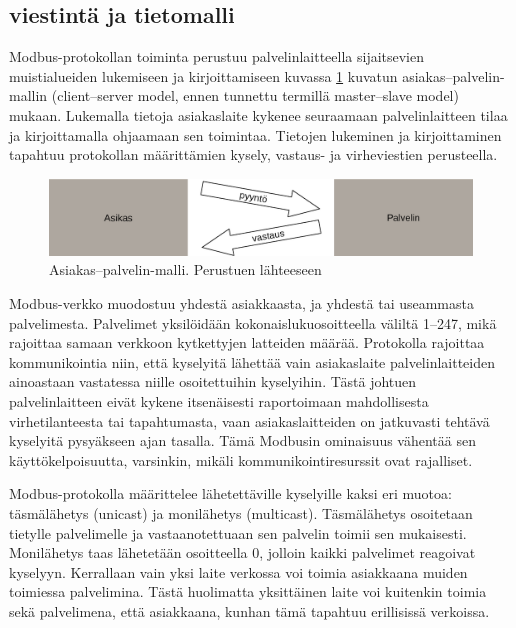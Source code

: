   \subsection{viestintä ja tietomalli}

  Modbus-protokollan toiminta perustuu palvelinlaitteella sijaitsevien muistialueiden lukemiseen ja kirjoittamiseen kuvassa \ref{fig:c_s} kuvatun asiakas--palvelin-mallin (client--server model, ennen tunnettu termillä master--slave model) mukaan.  Lukemalla tietoja asiakaslaite kykenee seuraamaan palvelinlaitteen tilaa ja kirjoittamalla ohjaamaan sen toimintaa. Tietojen lukeminen ja kirjoittaminen tapahtuu protokollan määrittämien kysely, vastaus- ja virheviestien perusteella.\parencite{modbusAppSpec}

  \begin{figure}[h]
    \centering
    \includegraphics[width=1\textwidth]{figures/client_server}
    \caption[asiakas--palvelin-malli]{Asiakas--palvelin-malli.  Perustuen lähteeseen \parencite{modbusAppSpec}}
    \label{fig:c_s}
  \end{figure}

  Modbus-verkko muodostuu yhdestä asiakkaasta, ja yhdestä tai useammasta palvelimesta. Palvelimet yksilöidään kokonaislukuosoitteella väliltä 1--247, mikä rajoittaa samaan verkkoon kytkettyjen latteiden määrää.  Protokolla rajoittaa kommunikointia niin, että kyselyitä lähettää vain asiakaslaite palvelinlaitteiden ainoastaan vastatessa niille osoitettuihin kyselyihin.\parencite{modbusSerialSpec} Tästä johtuen palvelinlaitteen eivät kykene itsenäisesti raportoimaan mahdollisesta virhetilanteesta tai tapahtumasta, vaan asiakaslaitteiden on jatkuvasti tehtävä kyselyitä pysyäkseen ajan tasalla. Tämä Modbusin ominaisuus vähentää sen käyttökelpoisuutta, varsinkin, mikäli kommunikointiresurssit ovat rajalliset.

  Modbus-protokolla määrittelee lähetettäville kyselyille kaksi eri muotoa: täsmälähetys (unicast) ja monilähetys (multicast). Täsmälähetys osoitetaan tietylle palvelimelle ja vastaanotettuaan sen palvelin toimii sen mukaisesti. Monilähetys taas lähetetään osoitteella 0, jolloin kaikki palvelimet reagoivat kyselyyn.\parencite{modbusSerialSpec} Kerrallaan vain yksi laite verkossa voi toimia asiakkaana muiden toimiessa palvelimina. Tästä huolimatta yksittäinen laite voi kuitenkin toimia sekä palvelimena, että asiakkaana, kunhan tämä tapahtuu erillisissä verkoissa.\parencite{DincerRosen}

